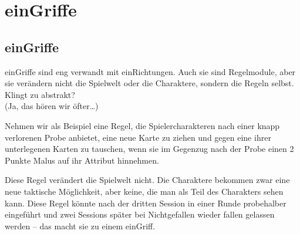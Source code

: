\part {einGriffe}
\chapter {einGriffe}

einGriffe sind eng verwandt mit einRichtungen. Auch sie sind Regelmodule, aber sie verändern nicht die Spielwelt oder die Charaktere, sondern die Regeln selbst. Klingt zu abstrakt?\\
(Ja, das hören wir öfter\dots)

Nehmen wir als Beispiel eine Regel, die Spielercharakteren nach einer knapp verlorenen Probe anbietet, eine neue Karte zu ziehen und gegen eine ihrer unterlegenen Karten zu tauschen, wenn sie im Gegenzug nach der Probe einen 2 Punkte Malus auf ihr Attribut hinnehmen.

Diese Regel verändert die Spielwelt nicht. Die Charaktere bekommen zwar eine neue taktische Möglichkeit, aber keine, die man als Teil des Charakters sehen kann. Diese Regel könnte nach der dritten Session in einer Runde probehalber eingeführt und zwei Sessions später bei Nichtgefallen wieder fallen gelassen werden -- das macht sie zu einem einGriff.

